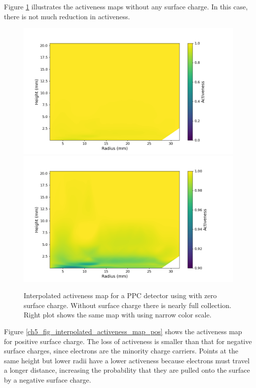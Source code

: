 Figure \ref{ch5_fig_interpolated_activeness_map_0} illustrates the activeness maps without any surface charge. In this case, there is not much reduction in activeness. 

\begin{figure}%
\centering
\includegraphics[trim={1.0cm 0cm 3.0cm 1cm},clip,width=0.49\linewidth]{ch5/figs/activeness_map_cubic_sc=0.0_ponama_1_5000_linear_full.png}
\includegraphics[trim={1.0cm 0cm 3.0cm 1cm},clip,width=0.49\linewidth]{ch5/figs/activeness_map_cubic_sc=0.0_ponama_1_5000_linear.png}
\caption{Interpolated activeness map for a PPC detector using \ehd with zero surface charge. Without surface charge there is nearly full collection. Right plot shows the same map with using narrow color scale.}
\label{ch5_fig_interpolated_activeness_map_0}
\end{figure}

Figure \ref{ch5_fig_interpolated_activeness_map_pos} shows the activeness map for positive surface charge. The loss of activeness is smaller than that for negative surface charges, since electrons are the minority charge carriers. Points at the same height but lower radii have a lower activeness because electrons must travel a longer distance, increasing the probability that they are pulled onto the surface by a negative surface charge.

